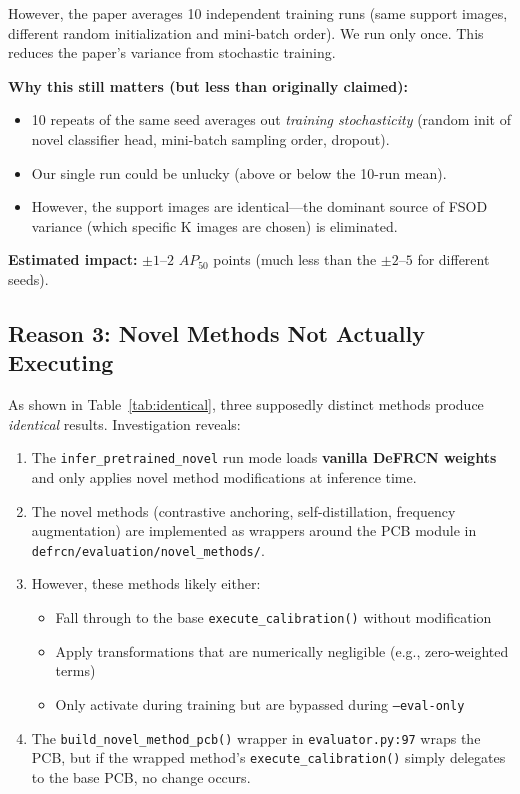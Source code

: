 \documentclass[11pt,a4paper]{article}
\begin{document}
However, the paper averages 10 independent training runs (same support images, different random initialization and mini-batch order). We run only once. This reduces the paper's variance from stochastic training.

\textbf{Why this still matters (but less than originally claimed):}
\begin{itemize}[nosep]
    \item 10 repeats of the same seed averages out \textit{training stochasticity} (random init of novel classifier head, mini-batch sampling order, dropout).
    \item Our single run could be unlucky (above or below the 10-run mean).
    \item However, the support images are identical---the dominant source of FSOD variance (which specific K images are chosen) is eliminated.
\end{itemize}

\textbf{Estimated impact:} $\pm 1$--$2$ $AP_{50}$ points (much less than the $\pm 2$--$5$ for different seeds).

\subsection{Reason 3: Novel Methods Not Actually Executing}

As shown in Table~\ref{tab:identical}, three supposedly distinct methods produce \textit{identical} results. Investigation reveals:

\begin{enumerate}[nosep]
    \item The \texttt{infer\_pretrained\_novel} run mode loads \textbf{vanilla DeFRCN weights} and only applies novel method modifications at inference time.
    \item The novel methods (contrastive anchoring, self-distillation, frequency augmentation) are implemented as wrappers around the PCB module in \texttt{defrcn/evaluation/novel\_methods/}.
    \item However, these methods likely either:
    \begin{itemize}[nosep]
        \item Fall through to the base \texttt{execute\_calibration()} without modification
        \item Apply transformations that are numerically negligible (e.g., zero-weighted terms)
        \item Only activate during training but are bypassed during \texttt{--eval-only}
    \end{itemize}
    \item The \texttt{build\_novel\_method\_pcb()} wrapper in \texttt{evaluator.py:97} wraps the PCB, but if the wrapped method's \texttt{execute\_calibration()} simply delegates to the base PCB, no change occurs.
\end{enumerate}
\end{document}
